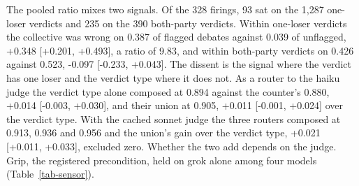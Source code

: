 The pooled ratio mixes two signals. Of the 328 firings, 93 sat on the 1,287
one-loser verdicts and 235 on the 390 both-party verdicts. Within one-loser
verdicts the collective was wrong on 0.387 of flagged debates against 0.039
of unflagged, +0.348 [+0.201, +0.493], a ratio of 9.83, and within
both-party verdicts on 0.426 against 0.523, -0.097 [-0.233, +0.043].
The dissent is the signal where the verdict has one loser and the verdict
type where it does not. As a router to the haiku judge the
verdict type alone composed at 0.894 against the counter's 0.880, +0.014
[-0.003, +0.030], and their union at 0.905, +0.011 [-0.001, +0.024] over
the verdict type.
With the cached sonnet judge the three routers composed at 0.913, 0.936 and
0.956 and the union's gain over the verdict type, +0.021 [+0.011, +0.033],
excluded zero. %
Whether the two add depends on the judge. Grip, the registered
precondition, held on grok alone among four models (Table~\ref{tab-sensor}).

